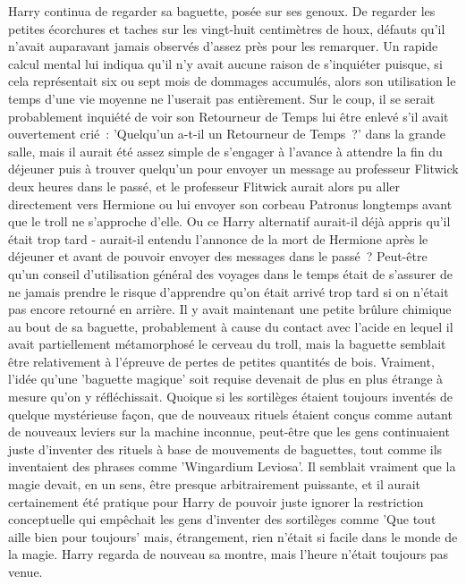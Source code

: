 Harry continua de regarder sa baguette, posée sur ses genoux. De regarder les petites écorchures et taches sur les vingt-huit centimètres de houx, défauts qu'il n'avait auparavant jamais observés d'assez près pour les remarquer. Un rapide calcul mental lui indiqua qu'il n'y avait aucune raison de s'inquiéter puisque, si cela représentait six ou sept mois de dommages accumulés, alors son utilisation le temps d'une vie moyenne ne l'userait pas entièrement. Sur le coup, il se serait probablement inquiété de voir son Retourneur de Temps lui être enlevé s'il avait ouvertement crié~: 'Quelqu'un a-t-il un Retourneur de Temps~?' dans la grande salle, mais il aurait été assez simple de s'engager à l'avance à attendre la fin du déjeuner puis à trouver quelqu'un pour envoyer un message au professeur Flitwick deux heures dans le passé, et le professeur Flitwick aurait alors pu aller directement vers Hermione ou lui envoyer son corbeau Patronus longtemps avant que le troll ne s'approche d'elle. Ou ce Harry alternatif aurait-il déjà appris qu'il était trop tard - aurait-il entendu l'annonce de la mort de Hermione après le déjeuner et avant de pouvoir envoyer des messages dans le passé~? Peut-être qu'un conseil d'utilisation général des voyages dans le temps était de s'assurer de ne jamais prendre le risque d'apprendre qu'on était arrivé trop tard si on n'était pas encore retourné en arrière. Il y avait maintenant une petite brûlure chimique au bout de sa baguette, probablement à cause du contact avec l'acide en lequel il avait partiellement métamorphosé le cerveau du troll, mais la baguette semblait être relativement à l'épreuve de pertes de petites quantités de bois. Vraiment, l'idée qu'une 'baguette magique' soit requise devenait de plus en plus étrange à mesure qu'on y réfléchissait. Quoique si les sortilèges étaient toujours inventés de quelque mystérieuse façon, que de nouveaux rituels étaient conçus comme autant de nouveaux leviers sur la machine inconnue, peut-être que les gens continuaient juste d'inventer des rituels à base de mouvements de baguettes, tout comme ils inventaient des phrases comme 'Wingardium Leviosa'. Il semblait vraiment que la magie devait, en un sens, être presque arbitrairement puissante, et il aurait certainement été pratique pour Harry de pouvoir juste ignorer la restriction conceptuelle qui empêchait les gens d'inventer des sortilèges comme 'Que tout aille bien pour toujours' mais, étrangement, rien n'était si facile dans le monde de la magie. Harry regarda de nouveau sa montre, mais l'heure n'était toujours pas venue.

